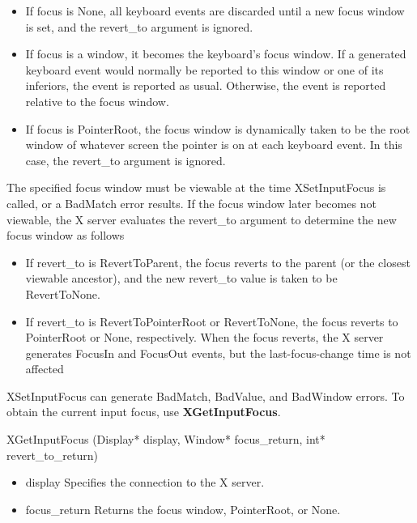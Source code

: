 \documentclass{report}
\begin{document}
\begin{itemize}
            \begin{itemize}
                \item If focus is None, all keyboard events are discarded until a new focus window is set, and the revert\_to argument is ignored.
                \item If focus is a window, it becomes the keyboard’s focus window. If a generated keyboard event would normally be reported to this window or one of its inferiors, the event is reported as usual. Otherwise, the event is reported relative to the focus window.
                \item If focus is PointerRoot, the focus window is dynamically taken to be the root window of whatever screen the pointer is on at each keyboard event. In this case, the revert\_to argument is ignored.
            \end{itemize}
            \bigbreak \noindent 
            The specified focus window must be viewable at the time XSetInputFocus is called, or a BadMatch error results. If the focus window later becomes not viewable, the X server evaluates the revert\_to argument to determine the new focus window as follows
            \begin{itemize}
                \item If revert\_to is RevertToParent, the focus reverts to the parent (or the closest viewable ancestor), and the new revert\_to value is taken to be RevertToNone.
                \item If revert\_to is RevertToPointerRoot or RevertToNone, the focus reverts to PointerRoot or None, respectively. When the focus reverts, the X server generates FocusIn and FocusOut events, but the last-focus-change time is not affected
            \end{itemize}
            XSetInputFocus can generate BadMatch, BadValue, and BadWindow errors.
            \bigbreak \noindent 
            To obtain the current input focus, use \textbf{XGetInputFocus}.
            \bigbreak \noindent  
            \begin{cppcode}
            XGetInputFocus (Display* display, Window* focus_return, int* revert_to_return)
            \end{cppcode}
            \bigbreak \noindent
            \begin{itemize}
                \item display Specifies the connection to the X server.
                \item focus\_return Returns the focus window, PointerRoot, or None.

\end{itemize}
\end{itemize}
\end{document}
